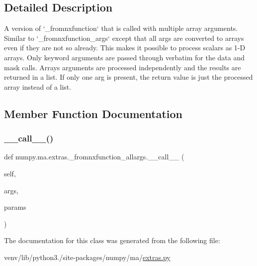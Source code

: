 \subsection{Detailed Description}
\begin{DoxyVerb}A version of `_fromnxfunction` that is called with multiple array
arguments. Similar to `_fromnxfunction_args` except that all args
are converted to arrays even if they are not so already. This makes
it possible to process scalars as 1-D arrays. Only keyword arguments
are passed through verbatim for the data and mask calls. Arrays
arguments are processed independently and the results are returned
in a list. If only one arg is present, the return value is just the
processed array instead of a list.
\end{DoxyVerb}
 

\subsection{Member Function Documentation}
\mbox{\label{classnumpy_1_1ma_1_1extras_1_1__fromnxfunction__allargs_abc3d29961f36a752ff2115f4108bdbfb}} 
\subsubsection{\texorpdfstring{\+\_\+\+\_\+call\+\_\+\+\_\+()}{\_\_call\_\_()}}
{\footnotesize\ttfamily def numpy.\+ma.\+extras.\+\_\+fromnxfunction\+\_\+allargs.\+\_\+\+\_\+call\+\_\+\+\_\+ (\begin{DoxyParamCaption}\item[{}]{self,  }\item[{}]{args,  }\item[{}]{params }\end{DoxyParamCaption})}



The documentation for this class was generated from the following file\+:\begin{DoxyCompactItemize}
\item 
venv/lib/python3./site-\/packages/numpy/ma/\hyperlink{extras_8py}{extras.\+py}\end{DoxyCompactItemize}
